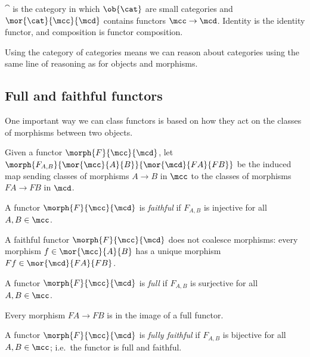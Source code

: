 \begin{example}
    \(\cat\) is the category in which \(\ob{\cat}\) are small categories and
    \(\mor{\cat}{\mcc}{\mcd}\) contains functors \(\mcc \to \mcd\).
    Identity is the identity functor, and composition is functor composition.
\end{example}

Using the category of categories means we can reason about categories using the
same line of reasoning as for objects and morphisms.

\subsection{Full and faithful functors}

One important way we can class functors is based on how they act on the classes
of morphisms between two objects.

\begin{notation}
    Given a functor \(\morph{F}{\mcc}{\mcd}\), let \(
    \morph{F_{A,B}}{\mor{\mcc}{A}{B}}{\mor{\mcd}{FA}{FB}}
    \) be the induced map sending classes of morphisms \(A \to B\) in \(\mcc\)
    to the classes of morphisms \(FA \to FB\) in \(\mcd\).
\end{notation}

\begin{definition}
    A functor \(\morph{F}{\mcc}{\mcd}\) is \emph{faithful} if \(F_{A,B}\) is
    injective for all \(A,B \in \mcc\).
\end{definition}

A faithful functor \(\morph{F}{\mcc}{\mcd}\) does not coalesce morphisms: every
morphism \(f \in \mor{\mcc}{A}{B}\) has a unique morphism
\(Ff \in \mor{\mcd}{FA}{FB}\).

\begin{definition}
    A functor \(\morph{F}{\mcc}{\mcd}\) is \emph{full} if \(F_{A,B}\) is
    surjective for all \(A,B \in \mcc\).
\end{definition}

Every morphism \(FA \to FB\) is in the image of a full functor.

\begin{definition}
    A functor \(\morph{F}{\mcc}{\mcd}\) is \emph{fully faithful} if \(F_{A,B}\)
    is bijective for all \(A, B \in \mcc\); i.e.\ the functor is full and
    faithful.
\end{definition}

